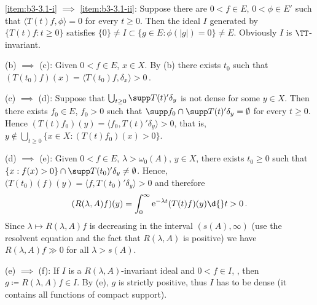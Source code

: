 \ref{item:b3-3.1-i} $\implies$ \ref{item:b3-3.1-ii}: Suppose there are $0 < f \in E$, $0 < \phi \in E'$ such that $\langle T(t)f,\phi \rangle = 0$ for every $t \geq 0$.
Then the ideal $I$ generated by $\{T(t)f : t \geq 0\}$ satisfies $\{0\} \neq I \subset \{g \in E : \phi(|g|) = 0\} \neq E$.
Obviously $I$ is $\TT$-invariant.

(b) $\implies$ (c): Given $0 < f \in E$, $x \in X$.
By (b) there exists $t_{0}$ such that $(T(t_{0})f)(x) = \langle T(t_{0})f,\delta_{x} \rangle > 0$\,.

(c) $\implies$ (d): Suppose that $\bigcup_{t \geq 0}\supp T(t)'\delta_{y}$ is not dense for some $y \in X$.
Then there exists $f_{0} \in E$, $f_{0} > 0$ such that
%
%
%
$\supp f_{0} \cap \supp T(t)'\delta_{y} = \emptyset$ for every $t \geq 0$.
Hence $(T(t)f_{0})(y) = \langle f_{0},T(t)'\delta_{y} \rangle > 0$, that is, $y \notin \bigcup_{t\geq 0}\{x \in X : (T(t)f_{0})(x) > 0\}$.

(d) $\implies$ (e): Given $0 < f \in E$, $\lambda > \omega_{0}(A)$, $y \in X$, there exists $t_{0} \geq 0$ such that $\{x : f(x) > 0\} \cap \supp T(t_{0})'\delta_{y} \neq \emptyset$.
Hence, $(T(t_{0})(f)(y) = \langle f,T(t_{0})'\delta_{y} \rangle > 0$ and therefore
\[
(R(\lambda,A)f)(y) = \int_{0}^{\infty} \mathrm{e}^{-\lambda t}(T(t)f)(y) \d{}t > 0\,.
\]
Since $\lambda \mapsto R(\lambda,A)f$ is decreasing in the interval $(s(A),\infty)$ (use the resolvent equation and the fact that $R(\lambda,A)$ is positive) we have $R(\lambda,A)f \gg 0$ for all $\lambda > s(A)$.

(e) $\implies$ (f): If $I$ is a $R(\lambda,A)$-invariant ideal and 0$ < f \in I$, , then $g \coloneqq R(\lambda,A)f \in I$. By (e), $g$ is strictly positive, thus $I$ has to be dense (it contains all functions of compact support). 

